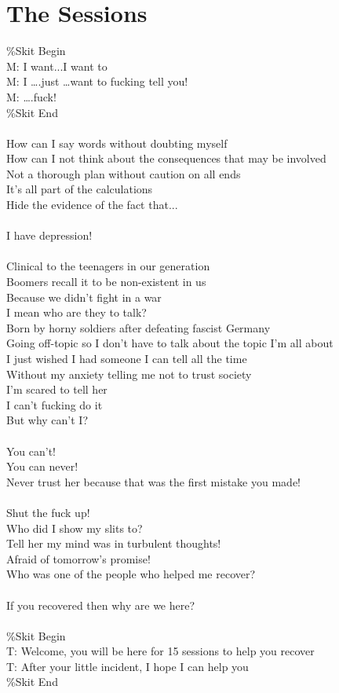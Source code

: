 \documentclass[12pt, b5paper, oneside]{book}
\begin{document}
\chapter{The Sessions}
\%Skit Begin 
\\M: I want...I want to
\\M: I \dots .just \dots want to fucking tell you!
\\M:  \dots .fuck!
\\\%Skit End
%
\\\\How can I say words without doubting myself
\\How can I not think about the consequences that may be involved
\\Not a thorough plan without caution on all ends
\\It's all part of the calculations
\\Hide the evidence of the fact that...
%
\\\\I have depression!
%
\\\\Clinical to the teenagers in our generation
\\Boomers recall it to be non-existent in us
\\Because we didn't fight in a war
\\I mean who are they to talk?
\\Born by horny soldiers after defeating fascist Germany
\\Going off-topic so I don't have to talk about the topic I'm all about
\\I just wished I had someone I can tell all the time
\\Without my anxiety telling me not to trust society
\\I'm scared to tell her
\\I can't fucking do it
\\But why can't I?
%
\\\\You can't!
\\You can never!
\\Never trust her because that was the first mistake you made!
%
\\\\Shut the fuck up!
\\Who did I show my slits to?
\\Tell her my mind was in turbulent thoughts!
\\Afraid of tomorrow's promise!
\\Who was one of the people who helped me recover?
%
\\\\If you recovered then why are we here?
%
\\\\\%Skit Begin 
\\T: Welcome, you will be here for 15 sessions to help you recover
\\T: After your little incident, I hope I can help you
\\\%Skit End 
\end{document}

